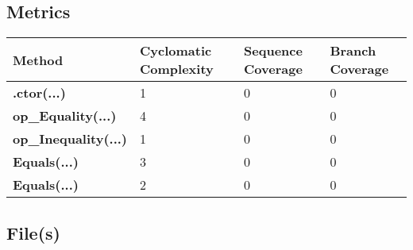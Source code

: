\documentclass[a4paper,10pt]{article}
\begin{document}
\subsection{Metrics}
\begin{longtable}[l]{|l|l|l|l|}
\hline
\textbf{Method} & \textbf{Cyclomatic Complexity} & \textbf{Sequence Coverage} & \textbf{Branch Coverage}\\
\hline
\textbf{.ctor(...)} & 1 & 0 & 0\\
\hline
\textbf{op\_Equality(...)} & 4 & 0 & 0\\
\hline
\textbf{op\_Inequality(...)} & 1 & 0 & 0\\
\hline
\textbf{Equals(...)} & 3 & 0 & 0\\
\hline
\textbf{Equals(...)} & 2 & 0 & 0\\
\hline
\end{longtable}
\subsection{File(s)}
\end{document}
